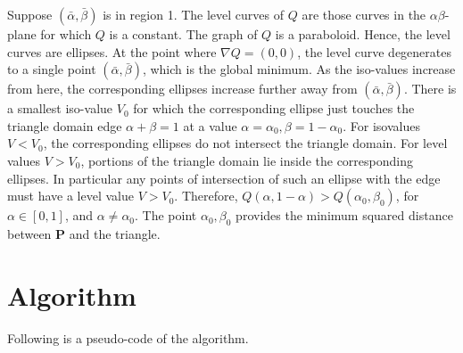 \documentclass[11pt]{article}
\newcommand{\PB}{\mathbf{P}}
\begin{document}
\par Suppose $(\bar{\alpha},\bar{\beta})$ is in region 1. The level curves of $Q$ are those curves in the $\alpha\beta$-plane for which $Q$ is a constant. The graph of $Q$ is a paraboloid. Hence, the level curves are ellipses. At the point where $\nabla Q = (0,0)$, the level curve degenerates to a single point $(\bar{\alpha},\bar{\beta})$, which is the global minimum. As the iso-values increase from here, the corresponding ellipses increase further away from $(\bar{\alpha},\bar{\beta})$. There is a smallest iso-value $V_0$ for which the corresponding ellipse just touches the triangle domain edge $\alpha+\beta=1$ at a value $\alpha = \alpha_0, \beta = 1 - \alpha_0$. For isovalues $V < V_0$, the corresponding ellipses do not intersect the triangle domain. For level values $V > V_0$, portions of the triangle domain lie inside the corresponding ellipses. In particular any points of intersection of such an ellipse with the edge must have a level value $V > V_0$. Therefore, $Q(\alpha, 1-\alpha) > Q(\alpha_0,\beta_0)$, for $\alpha \in [0,1]$, and $\alpha \neq \alpha_0$. The point $\alpha_0,\beta_0$ provides the minimum squared distance between $\PB$ and the triangle. 
 

\section{Algorithm}
\vspace{-10pt}
Following is a pseudo-code of the algorithm.
\vspace{-10pt}
\end{document}
